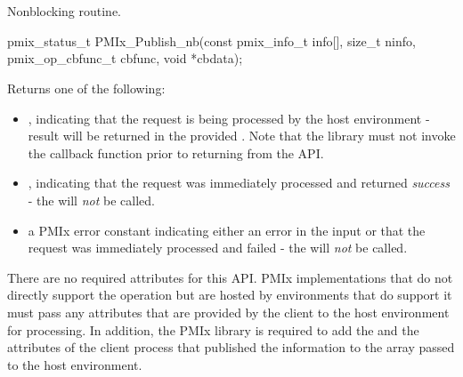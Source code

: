 \section{}

\summary

Nonblocking  routine.

\format

\cspecificstart
\begin{codepar}
pmix_status_t
PMIx_Publish_nb(const pmix_info_t info[], size_t ninfo,
                pmix_op_cbfunc_t cbfunc, void *cbdata);
\end{codepar}
\cspecificend

\begin{arglist}
\end{arglist}

Returns one of the following:

\begin{itemize}
    \item {}, indicating that the request is being processed by the host environment - result will be returned in the provided . Note that the library must not invoke the callback function prior to returning from the \ac{API}.
    \item {}, indicating that the request was immediately processed and returned \textit{success} - the  will \textit{not} be called.
    \item a PMIx error constant indicating either an error in the input or that the request was immediately processed and failed - the  will \textit{not} be called.
\end{itemize}

\reqattrstart
There are no required attributes for this \ac{API}. \ac{PMIx} implementations that do not directly support the operation but are hosted by environments that do support it must pass any attributes that are provided by the client to the host environment for processing. In addition, the \ac{PMIx} library is required to add the  and the  attributes of the client process that published the information to the  array passed to the host environment.

